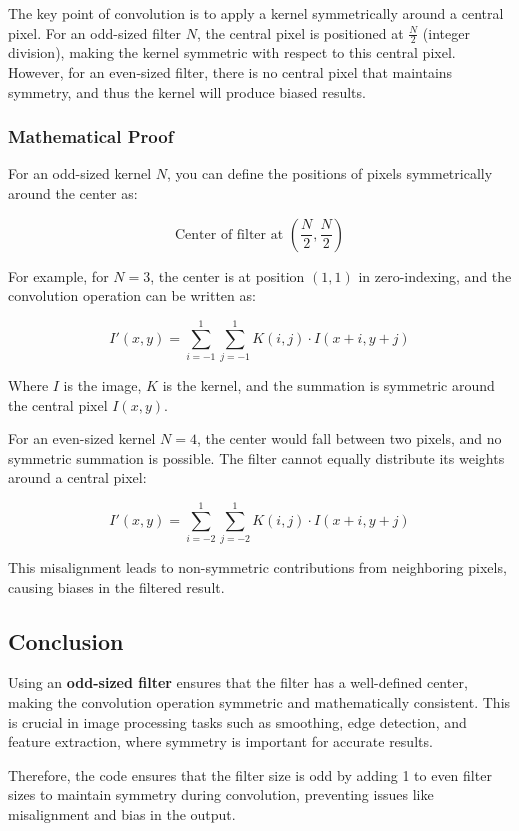 \documentclass{article}
\begin{document}
The key point of convolution is to apply a kernel symmetrically around a central pixel. For an odd-sized filter $N$, the central pixel is positioned at $\frac{N}{2}$ (integer division), making the kernel symmetric with respect to this central pixel. However, for an even-sized filter, there is no central pixel that maintains symmetry, and thus the kernel will produce biased results.

\subsubsection{Mathematical Proof}

For an odd-sized kernel $N$, you can define the positions of pixels symmetrically around the center as:

\[
\text{Center of filter at } \left( \frac{N}{2}, \frac{N}{2} \right) 
\]

For example, for $N = 3$, the center is at position $(1,1)$ in zero-indexing, and the convolution operation can be written as:

\[
I'(x,y) = \sum_{i=-1}^{1} \sum_{j=-1}^{1} K(i,j) \cdot I(x+i, y+j)
\]

Where $I$ is the image, $K$ is the kernel, and the summation is symmetric around the central pixel $I(x, y)$.

For an even-sized kernel $N = 4$, the center would fall between two pixels, and no symmetric summation is possible. The filter cannot equally distribute its weights around a central pixel:

\[
I'(x,y) = \sum_{i=-2}^{1} \sum_{j=-2}^{1} K(i,j) \cdot I(x+i, y+j)
\]

This misalignment leads to non-symmetric contributions from neighboring pixels, causing biases in the filtered result.

\subsection{Conclusion}

Using an \textbf{odd-sized filter} ensures that the filter has a well-defined center, making the convolution operation symmetric and mathematically consistent. This is crucial in image processing tasks such as smoothing, edge detection, and feature extraction, where symmetry is important for accurate results.

Therefore, the code ensures that the filter size is odd by adding 1 to even filter sizes to maintain symmetry during convolution, preventing issues like misalignment and bias in the output.
\end{document}
